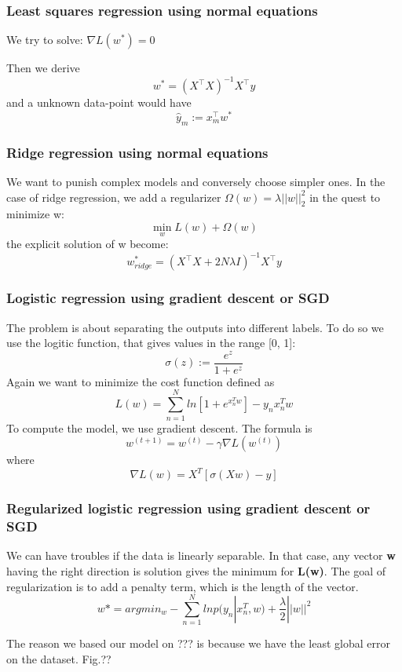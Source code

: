 \documentclass[10pt,conference,compsocconf]{IEEEtran}
\begin{document}
	
	\subsubsection{Least squares regression using normal equations}
	
	We try to solve: $\nabla L(w^*) = 0$
	
	Then we derive
	$$w^* = (X^\top X)^{-1}X^\top y$$
	and a unknown data-point would have 
	$$\hat y_m := x_m^\top w^*$$
	
	\subsubsection{Ridge regression using normal equations}
	
	We want to punish complex models and conversely choose simpler ones.
	In the case of ridge regression, we add a regularizer $\Omega(w) = \lambda||w||_2^2$ in the quest to minimize w:
	$$\min\limits_{w} L(w) + \Omega(w)$$
	the explicit solution of w become:
	$$w_{ridge}^* = (X^\top X+2N\lambda I)^{-1}X^\top y$$
	\subsubsection{Logistic regression using gradient descent or SGD}
	
	The problem is about separating the outputs into different labels. To do so we use the logitic function, that gives values in the range [0, 1]:
	$$\sigma(z) := \frac{e^z}{1 + e^z}$$
	Again we want to minimize the cost function defined as 
	$$ L(w) = \sum\limits_{n=1}^N ln[1 + e^{x_n^Tw}] - y_nx_n^Tw$$
	To compute the model, we use gradient descent. The formula is 
	$$w^{(t+1)}=w^{(t)} -\gamma \nabla L(w^{(t)})$$
	where  $$\nabla L(w) = X^T[\sigma(Xw) - y]$$ 
	
	\subsubsection{Regularized logistic regression using gradient descent or SGD}
	We can have troubles if the data is linearly separable. In that case, any vector \textbf{w} having the right direction is solution gives the minimum for \textbf{L(w)}. The goal of regularization is to add a penalty term, which is the length of the vector.
	$$ w* = argmin_w - \sum\limits_{n=1}^N ln p(y_n|x_n^T, w) + \frac{\lambda}{2}||w||^2 $$
	
	
	The reason we based our model on ??? is because we have the least global error on the dataset. Fig.?? 
	
\end{document}
